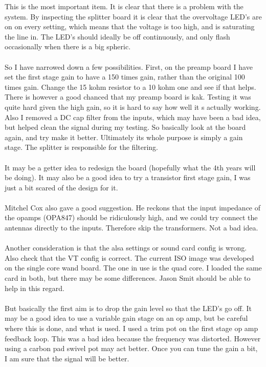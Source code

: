 \documentclass[a4paper,12pt]{article}
\begin{document}
This is the most important item. It is clear that there is a problem with the system. By inspecting the splitter board it is clear that the overvoltage LED's are on on every setting, which means that the voltage is too high, and is saturating the line in. The LED's should ideally be off continuously, and only flash occasionally when there is a big spheric.\\
\\
So I have narrowed down a few possibilities. First, on the preamp board I have set the first stage gain to have a 150 times gain, rather than the original 100 times gain. Change the 15 kohm resistor to a 10 kohm one and see if that helps. There is however a good chanced that my preamp board is kak. Testing it was quite hard given the high gain, so it is hard to say how well it s actually working. Also I removed a DC cap filter from the inputs, which may have been a bad idea, but helped clean the signal during my testing. So basically look at the board again, and try make it better. Ultimately its whole purpose is simply a gain stage. The splitter is responsible for the filtering.\\
\\
It may be a getter idea to redesign the board (hopefully what the 4th years will be doing). It may also be a good idea to try a transistor first stage gain, I was just a bit scared of the design for it.\\
\\
Mitchel Cox also gave a good suggestion. He reckons that the input impedance of the opamps (OPA847) should be ridiculously high, and we could try connect the antennas directly to the inputs. Therefore skip the transformers. Not a bad idea.\\
\\
Another consideration is that the alsa settings or sound card config is wrong. Also check that the VT config is correct. The current ISO image was developed on the single core wand board. The one in use is the quad core. I loaded the same card in both, but there may be some differences. Jason Smit should be able to help in this regard.\\
\\
But basically the first aim is to drop the gain level so that the LED's go off. It may be a good idea to use a variable gain stage on an op amp, but be careful where this is done, and what is used. I used a trim pot on the first stage op amp feedback loop. This was a bad idea because the frequency was distorted. However using a carbon pad swivel pot may act better. Once you can tune the gain a bit, I am sure that the signal will be better.
\end{document}
